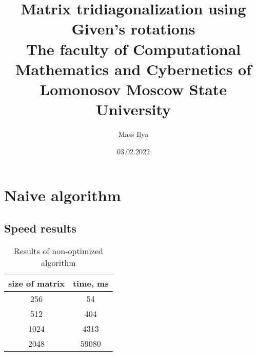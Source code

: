 \documentclass[12pt]{report}
\begin{document}
	\title{
		{Matrix tridiagonalization using Given's rotations}\\
		{\large The faculty of Computational Mathematics and Cybernetics of Lomonosov Moscow State University}\\
	}
	\author{Mass Ilya}
	\date{03.02.2022}
	
	\maketitle
	
	\chapter{Naive algorithm}
	
	
	\section{Speed results}
	\begin{table}[h!]
		\centering
		\begin{tabular}{ | c | c | } 
			\hline
			size of matrix & time, ms\\  [0.5ex] 
			\hline\hline
			256 & 54 \\ 
			\hline
			512 & 404 \\ 
			\hline
			1024 & 4313 \\
			\hline
			2048 & 59080 \\
			\hline
		\end{tabular}
		\caption{Results of non-optimized algorithm}
	\end{table}  
	
\end{document}
